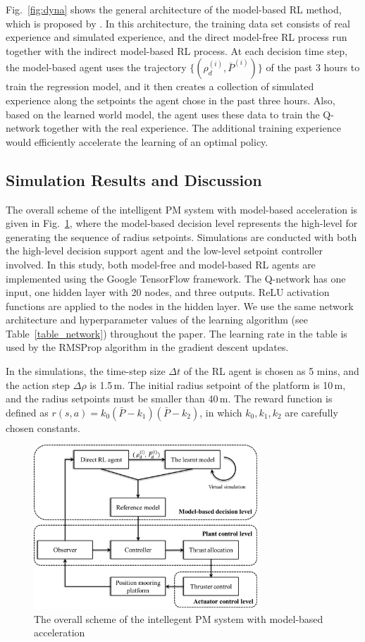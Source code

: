 \begin{sloppypar}
Fig.~\ref{fig:dyna} shows the general architecture of the model-based RL method, which is proposed by \cite{sutton1999reinforcement} . In this architecture, the training data set consists of real experience and simulated experience, and the direct model-free RL process run together with the indirect model-based RL process. At each decision time step, the model-based agent uses the trajectory $\{(\rho^{(i)}_d, \bar{P}^{(i)})\}$ of the past 3 hours to train the regression model, and it then creates a collection of simulated experience along the setpoints the agent chose in the past three hours. Also, based on the learned world model, the agent uses these data to train the Q-network together with the real experience. The additional training experience would efficiently accelerate the learning of an optimal policy.

\subsection{Simulation Results and Discussion}
The overall scheme of the intelligent PM system with model-based acceleration is given in Fig.~\ref{fig:model_based}, where the model-based decision level represents the high-level for generating the sequence of radius setpoints.
Simulations are conducted with both the high-level decision support agent and the low-level setpoint controller involved. In this study, both model-free and model-based RL agents are implemented using the Google TensorFlow framework. The Q-network has one input, one hidden layer with 20 nodes, and three outputs. ReLU activation functions are applied to the nodes in the hidden layer. We use the same network architecture and hyperparameter values of the learning algorithm (see Table~\ref{table_network}) throughout the paper. The learning rate in the table is used by the RMSProp algorithm in the gradient descent updates.

In the simulations, the time-step size $\Delta t$ of the RL agent is chosen as 5 mins, and the action step $\Delta\rho$ is 1.5$\,$m. The initial radius setpoint of the platform is 10$\,$m, and the radius setpoints must be smaller than 40$\,$m. The reward function is defined as $r(s,a) = k_0(\bar{P}-k_1)(\bar{P}-k_2)$, in which $k_0,k_1,k_2$ are carefully chosen constants.

\begin{figure}[!htp]
	\centering
	\includegraphics[width=3.3in]{Images/model_based.png}
	\caption{The overall scheme of the intellegent PM system with model-based acceleration}
	\label{fig:model_based}
\end{figure}


\end{sloppypar}
